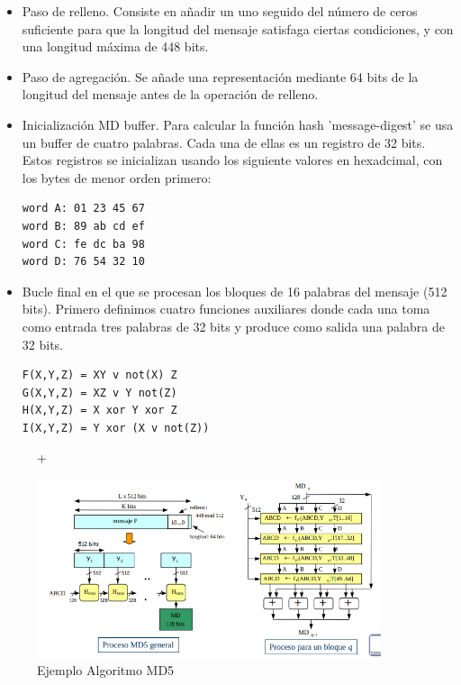 \documentclass[a4paper,11pt]{article}
\begin{document}
\begin{itemize}
\item Paso de relleno. Consiste en añadir un uno seguido del número de ceros suficiente para que la longitud del mensaje satisfaga ciertas condiciones, y con una longitud máxima de 448 bits.

\item Paso de agregación. Se añade una representación mediante 64 bits de la longitud del mensaje antes de la operación de relleno.

\item Inicialización MD buffer. Para calcular la función hash 'message-digest' se usa un buffer de cuatro palabras. Cada una de ellas es un registro de 32 bits. Estos registros se inicializan usando los siguiente valores en hexadcimal, con los bytes de menor orden primero:

\begin{verbatim}
word A: 01 23 45 67
word B: 89 ab cd ef
word C: fe dc ba 98
word D: 76 54 32 10
\end{verbatim}

\item Bucle final en el que se procesan los bloques de 16 palabras del mensaje (512 bits). Primero definimos cuatro funciones auxiliares donde cada una toma como entrada tres palabras de 32 bits y produce como salida una palabra de 32 bits.

\begin{verbatim}
F(X,Y,Z) = XY v not(X) Z
G(X,Y,Z) = XZ v Y not(Z)
H(X,Y,Z) = X xor Y xor Z
I(X,Y,Z) = Y xor (X v not(Z))
\end{verbatim}

\end{itemize}

\begin{figure}  +
\centering
\caption{Ejemplo Algoritmo MD5}
\includegraphics[scale=1,width=0.9\textwidth]{ejemplo_md5.png}
\end{figure}
\end{document}
